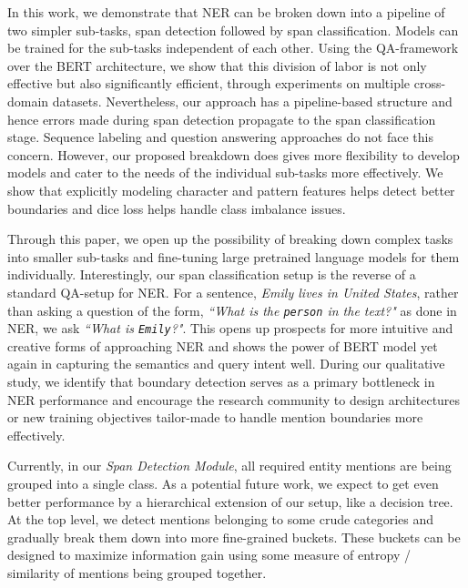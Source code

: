 In this work, we demonstrate that NER can be broken down into a pipeline of two simpler sub-tasks, span detection followed by span classification. Models can be trained for the sub-tasks independent of each other. Using the QA-framework over the BERT architecture, we show that this division of labor is not only effective but also significantly efficient, through experiments on multiple cross-domain datasets. Nevertheless, our approach has a pipeline-based structure and hence errors made during span detection propagate to the span classification stage. Sequence labeling and question answering approaches do not face this concern. However, our proposed breakdown does gives more flexibility to develop models and cater to the needs of the individual sub-tasks more effectively. We show that explicitly modeling character and pattern features helps detect better boundaries and dice loss helps handle class imbalance issues.

Through this paper, we open up the possibility of breaking down complex tasks into smaller sub-tasks and fine-tuning large pretrained language models for them individually. Interestingly, our span classification setup is the reverse of a standard QA-setup for NER. For a sentence, \textit{Emily lives in United States}, rather than asking a question of the form, \textit{``What is the \texttt{person} in the text?"} as done in NER, we ask \textit{``What is \texttt{Emily}?"}. This opens up prospects for more intuitive and creative forms of approaching NER and shows the power of BERT model yet again in capturing the semantics and query intent well. During our qualitative study, we identify that boundary detection serves as a primary bottleneck in NER performance and encourage the research community to design architectures or new training objectives tailor-made to handle mention boundaries more effectively. 
    
Currently, in our \textit{Span Detection Module}, all required entity mentions are being grouped into a single class. As a potential future work, we expect to get even better performance by a hierarchical extension of our setup, like a decision tree. At the top level, we detect mentions belonging to some crude categories and gradually break them down into more fine-grained buckets. These buckets can be designed to maximize information gain using some measure of entropy / similarity of mentions being grouped together.
